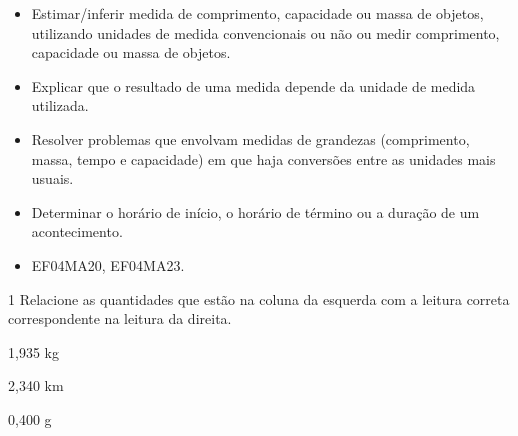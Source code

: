 \begin{mdframed}[linewidth=2pt,linecolor=salmao,roundcorner=2pt]
\begin{itemize}
\item Estimar/inferir medida de comprimento, capacidade ou massa de objetos,
utilizando unidades de medida convencionais ou não ou medir comprimento,
capacidade ou massa de objetos.

\item Explicar que o resultado de uma medida depende da unidade de medida
utilizada.

\item Resolver problemas que envolvam medidas de grandezas (comprimento,
massa, tempo e capacidade) em que haja conversões entre as unidades mais
usuais.

\item Determinar o horário de início, o horário de término ou a duração de
um acontecimento.
\end{itemize}


\begin{itemize}
\item EF04MA20, EF04MA23.
\end{itemize}



\num{1} Relacione as quantidades que estão na coluna da esquerda com a leitura correta
correspondente na leitura da direita.

\begin{multicols}{2}
1,935 kg 

2,340 km 

0,400 g 


\end{multicols}
\end{mdframed}
